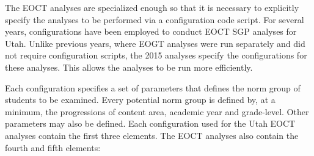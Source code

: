 \documentclass[12pt]{article}
\begin{document}
The EOCT analyses are specialized enough so that it is necessary to
explicitly specify the analyses to be performed via a configuration code
script. For several years, configurations have been employed to conduct
EOCT SGP analyses for Utah. Unlike previous years, where EOGT analyses
were run separately and did not require configuration scripts, the 2015
analyses specify the configurations for these analyses. This allows the
analyses to be run more efficiently.

Each configuration specifies a set of parameters that defines the norm
group of students to be examined. Every potential norm group is defined
by, at a minimum, the progressions of content area, academic year and
grade-level. Other parameters may also be defined. Each configuration
used for the Utah EOCT analyses contain the first three elements. The
EOCT analyses also contain the fourth and fifth elements:
\end{document}
